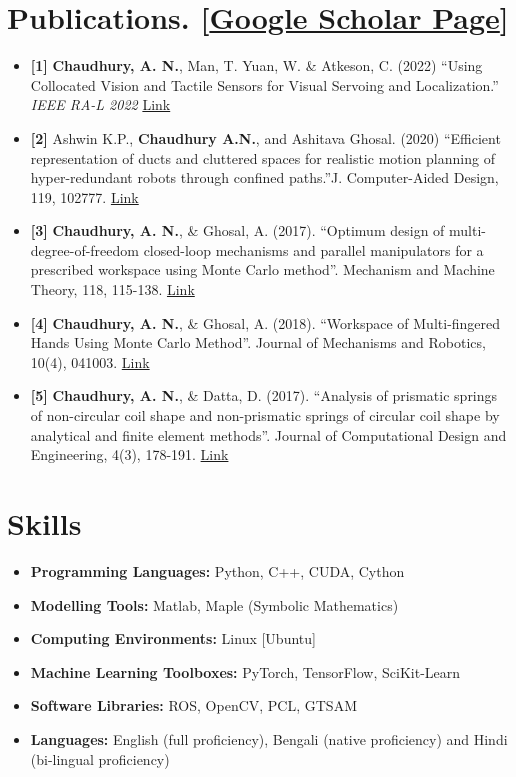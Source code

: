 \documentclass[letterpaper,11pt]{article}
\newcommand{\resumeItem}[2]{
  \item\small{
    \textbf{#1 }{ #2 \vspace{-2pt}}
  }
}
\newcommand{\resumeSubItem}[2]{\resumeItem{#1}{#2}\vspace{-4pt}}
\newcommand{\resumeSubHeadingListStart}{\begin{itemize}[label={},leftmargin=*]}
\newcommand{\resumeSubHeadingListEnd}{\end{itemize}}
\begin{document}
\section{Publications. \small{[\href{https://scholar.google.com/citations?user=rZ58Bf8AAAAJ&hl=en}{Google Scholar Page}}]}
  \resumeSubHeadingListStart
  
    \resumeSubItem{[1]}
      { \textbf{Chaudhury, A. N.}, Man, T.  Yuan, W. \& Atkeson, C. (2022) ``Using Collocated Vision and Tactile Sensors for Visual Servoing and Localization.'' \emph{IEEE RA-L 2022} \href{https://arkadeepnc.github.io/projects/collocated_vision_touch/img/ICRA_RAL_Formatted-compressed.pdf}{Link}}
      
    \resumeSubItem{[2]}
      {Ashwin K.P., \textbf{Chaudhury A.N.}, and Ashitava Ghosal. (2020) ``Efficient representation of ducts and cluttered spaces for realistic motion planning of hyper-redundant robots through confined paths.''J. Computer-Aided Design, 119, 102777. \href{https://www.sciencedirect.com/science/article/pii/S0010448518304135}{Link}}
      
    \resumeSubItem{[3]}
      { \textbf{Chaudhury, A. N.}, \& Ghosal, A. (2017). ``Optimum design of multi-degree-of-freedom closed-loop mechanisms and parallel manipulators for a prescribed workspace using Monte Carlo method''. Mechanism and Machine Theory, 118, 115-138.  \href{https://www.sciencedirect.com/science/article/abs/pii/S0094114X16303184}{Link}}
      
  \resumeSubItem{[4]}
  {\textbf{Chaudhury, A. N.}, \& Ghosal, A. (2018). ``Workspace of Multi-fingered Hands Using Monte Carlo Method''. Journal of Mechanisms and Robotics, 10(4), 041003. \href{https://asmedigitalcollection.asme.org/mechanismsrobotics/article-abstract/10/4/041003/366587/Workspace-of-Multifingered-Hands-Using-Monte-Carlo?redirectedFrom=fulltext}{ Link}}
  
  \resumeSubItem{[5]}
  {\textbf{Chaudhury, A. N.}, \& Datta, D. (2017). ``Analysis of prismatic springs of non-circular coil shape and non-prismatic springs of circular coil shape by analytical and finite element methods''. Journal of Computational Design and Engineering, 4(3), 178-191.
\href{https://www.sciencedirect.com/science/article/pii/S2288430016301385}{Link}}
\resumeSubHeadingListEnd


\section{Skills}
  \resumeSubHeadingListStart
    \resumeSubItem{Programming Languages:}      {Python, C++, CUDA, Cython }
    \resumeSubItem{Modelling Tools:}       {Matlab, Maple (Symbolic Mathematics)}
    \resumeSubItem{Computing Environments:} {Linux [Ubuntu]}
    \resumeSubItem{Machine Learning Toolboxes:} {PyTorch, TensorFlow, SciKit-Learn}
    \resumeSubItem{Software Libraries:}{ROS, OpenCV, PCL, GTSAM}
    \resumeSubItem{Languages:}  {English (full proficiency), Bengali (native proficiency) and Hindi (bi-lingual proficiency)}
\resumeSubHeadingListEnd
\end{document}
